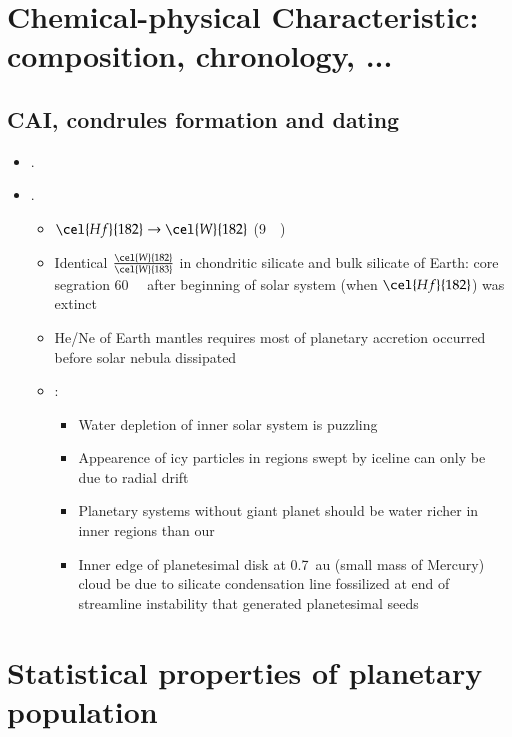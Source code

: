 \documentclass[main.tex]{subfiles}
\begin{document}
\chapter{}

\chapter{Chemical-physical Characteristic: composition, chronology, ...}

\section{CAI, condrules formation and dating}

\begin{itemize}
    \item \cite{bollard2017early}. 
    \item \cite{yin2002short}.
    \begin{itemize}
        \item $\cel{Hf}{182}\to\cel{W}{182}$ (\SI{9}{\mega\year})
        \item Identical $\frac{\cel{W}{182}}{\cel{W}{183}}$ in chondritic silicate and bulk silicate of Earth: core segration \SI{60}{\mega\year} after beginning of solar system (when $\cel{Hf}{182}$) was extinct
        \item He/Ne of Earth mantles requires most of planetary accretion occurred before solar nebula dissipated
        \item \cite{morbidelli2016fossilized}:
        \begin{itemize}
            \item Water depletion of inner solar system is puzzling
            \item Appearence of icy particles in regions swept by iceline can only be due to radial drift
            \item Planetary systems without giant planet should be water richer in inner regions than our
            \item Inner edge of planetesimal disk at \SI{0.7}{\astronomicalunit} (small mass of Mercury) cloud be due to silicate condensation line fossilized at end of streamline instability that generated planetesimal seeds
        \end{itemize}
    \end{itemize}
\end{itemize}

\chapter{Statistical properties of planetary population}
\end{document}
